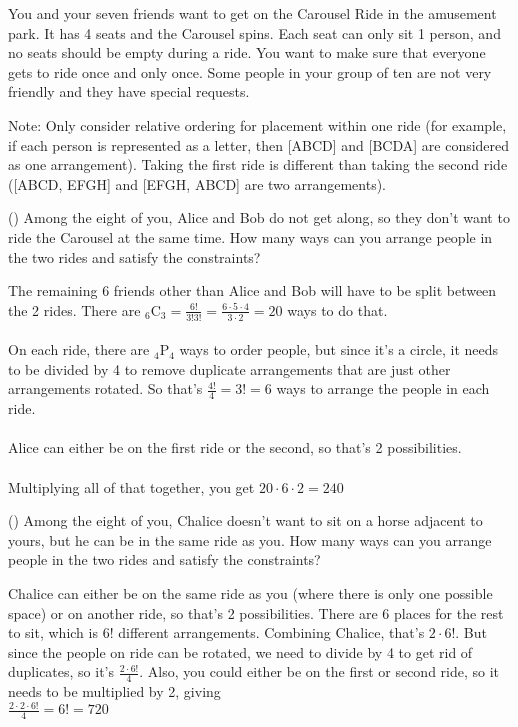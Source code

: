 \documentclass[leqno]{article}
\numberwithin{equation}{section}
\theoremstyle{definition}
\newcommand{\comb}[2]{_{#1}\mathrm{C}_{#2}}
\newcommand{\perm}[2]{_{#1}\mathrm{P}_{#2}}
\newcounter{parts}
\newcounter{problems}[parts]
\newcounter{questions}[problems]
\newcommand{\question}[2]{\stepcounter{questions}
  {\large (\alph{questions}) #1 \marginpar{[#2 pts]} \\[.3cm]}}
\begin{document}
You and your seven friends want to get on the Carousel Ride in the amusement park. It has 4 seats and the Carousel spins. Each seat can only sit 1 person, and no seats should be empty during a ride. You want to make sure that everyone gets to ride once and only once. Some people in your group of ten are not very friendly and they have special requests.

Note: Only consider relative ordering for placement within one ride (for example, if each person is represented as a letter, then [ABCD] and [BCDA] are considered as one arrangement). Taking the first ride is different than taking the second ride ([ABCD, EFGH] and [EFGH, ABCD] are two arrangements).

\bigskip
\bigskip

\question{Among the eight of you, Alice and Bob do not get along, so they don't want to ride the Carousel at the same time. How many ways can you arrange people in the two rides and satisfy the constraints?}{15}

The remaining 6 friends other than Alice and Bob will have to be split between the 2 rides. There are $\displaystyle \comb{6}{3} = \frac{6!}{3!3!} = \frac{6 \cdot 5 \cdot 4}{3 \cdot 2} = 20$ ways to do that.\\
\,\\
On each ride, there are $\perm{4}{4}$ ways to order people, but since it's a circle, it needs to be divided by 4 to remove duplicate arrangements that are just other arrangements rotated. So that's $\displaystyle \frac{4!}{4} = 3! = 6$ ways to arrange the people in each ride.\\
\,\\
Alice can either be on the first ride or the second, so that's 2 possibilities.\\
\,\\
Multiplying all of that together, you get $20 \cdot 6 \cdot 2 = 240$

\bigskip
\bigskip
\bigskip
\bigskip
\bigskip
\bigskip

\question{Among the eight of you, Chalice doesn’t want to sit on a horse adjacent to yours, but he can be in the same ride as you. How many ways can you arrange people in the two rides and satisfy the constraints?}{15}

Chalice can either be on the same ride as you (where there is only one possible space) or on another ride, so that's 2 possibilities. There are 6 places for the rest to sit, which is $6!$ different arrangements. Combining Chalice, that's $2 \cdot 6!$. But since the people on  ride can be rotated, we need to divide by 4 to get rid of duplicates, so it's $\displaystyle \frac{2 \cdot 6!}{4}$. Also, you could either be on the first or second ride, so it needs to be multiplied by 2, giving\\
$\displaystyle \frac{2 \cdot 2 \cdot 6!}{4} = 6! = 720$
\end{document}
